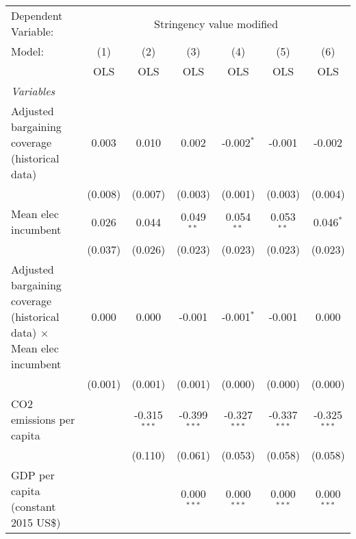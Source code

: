 
\begingroup
\centering
\begin{tabular}{lcccccc}
   \toprule
   Dependent Variable: & \multicolumn{6}{c}{Stringency value modified}\\
   Model:                                                                       & (1)     & (2)            & (3)            & (4)            & (5)            & (6)\\  
                                                                                &  OLS    & OLS            & OLS            & OLS            & OLS            & OLS\\  
   \midrule
   \emph{Variables}\\
   Adjusted bargaining coverage (historical data)                               & 0.003   & 0.010          & 0.002          & -0.002$^{*}$   & -0.001         & -0.002\\   
                                                                                & (0.008) & (0.007)        & (0.003)        & (0.001)        & (0.003)        & (0.004)\\   
   Mean elec incumbent                                                          & 0.026   & 0.044          & 0.049$^{**}$   & 0.054$^{**}$   & 0.053$^{**}$   & 0.046$^{*}$\\   
                                                                                & (0.037) & (0.026)        & (0.023)        & (0.023)        & (0.023)        & (0.023)\\   
   Adjusted bargaining coverage (historical data) $\times$ Mean elec incumbent  & 0.000   & 0.000          & -0.001         & -0.001$^{*}$   & -0.001         & 0.000\\   
                                                                                & (0.001) & (0.001)        & (0.001)        & (0.000)        & (0.000)        & (0.000)\\   
   CO2 emissions per capita                                                     &         & -0.315$^{***}$ & -0.399$^{***}$ & -0.327$^{***}$ & -0.337$^{***}$ & -0.325$^{***}$\\   
                                                                                &         & (0.110)        & (0.061)        & (0.053)        & (0.058)        & (0.058)\\   
   GDP per capita (constant 2015 US\$)                                          &         &                & 0.000$^{***}$  & 0.000$^{***}$  & 0.000$^{***}$  & 0.000$^{***}$\\   

\end{tabular}
